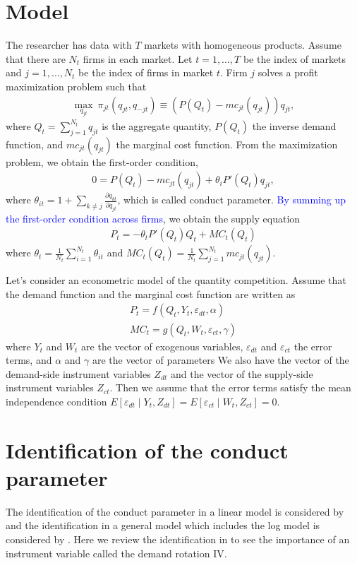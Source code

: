 \documentclass[11pt, a4paper]{article}
\begin{document}
\section{Model}
The researcher has data with $T$ markets with homogeneous products.
Assume that there are $N_t$ firms in each market.
Let $t = 1,\ldots, T$ be the index of markets and $j = 1, \ldots, N_t$ be the index of firms in market $t$.
Firm $j$ solves a profit maximization problem such that
\begin{align}
    \max_{q_{jt}} \ \pi_{jt}(q_{jt}, q_{-jt}) \equiv (P(Q_t) - mc_{jt}(q_{jt}))q_{jt},\nonumber
\end{align}
where $Q_t = \sum_{j = 1}^{N_t} q_{jt}$ is the aggregate quantity, $P(Q_t)$ the inverse demand function, and $mc_{jt}(q_{jt})$ the marginal cost function.
From the maximization problem, we obtain the first-order condition,
\begin{align}
    0 = P(Q_{t}) - mc_{jt}(q_{jt}) + \theta_i P'(Q_{t})q_{jt},\nonumber
\end{align}
where $\theta_{it} = 1 + \sum_{k\ne j}\frac{\partial q_{kt}}{\partial q_{jt}}$, which is called conduct parameter.
\textcolor{blue}{By summing up the first-order condition across firms}, we obtain the supply equation 
\begin{align}
     P_t = -\theta_{t}P'(Q_{t})Q_t + MC_t(Q_t)\label{eq:supply_relation}
\end{align}
where $\theta_t = \frac{1}{N_t}\sum_{i = 1}^{N_t}\theta_{it}$ and $MC_t(Q_t) = \frac{1}{N_t}\sum_{j = 1}^{N_t} mc_{jt}(q_{jt})$.

Let's consider an econometric model of the quantity competition.
Assume that the demand function and the marginal cost function are written as 
\begin{align}
    P_t = f(Q_t, Y_t, \varepsilon_{dt}, \alpha) \label{eq:demand}\\
    MC_t = g(Q_t, W_t, \varepsilon_{ct}, \gamma)\label{eq:marginal_cost}
\end{align}
where $Y_t$ and $W_t$ are the vector of exogenous variables, $\varepsilon_{dt}$ and $\varepsilon_{ct}$ the error terms, and $\alpha$ and $\gamma$ are the vector of parameters
We also have the vector of the demand-side instrument variables $Z_{dt}$ and the vector of the supply-side instrument variables $Z_{ct}$.
Then we assume that the error terms satisfy the mean independence condition $E[\varepsilon_{dt}\mid Y_t, Z_{dt}] = E[\varepsilon_{ct} \mid W_t, Z_{ct}] =0$.


\section{Identification of the conduct parameter}
The identification of the conduct parameter in a linear model is considered by \cite{bresnahan1982oligopoly} and the identification in a general model which includes the log model is considered by \cite{lau1982identifying}.
Here we review the identification in \cite{bresnahan1982oligopoly} to see the importance of an instrument variable called the demand rotation IV.
\end{document}

